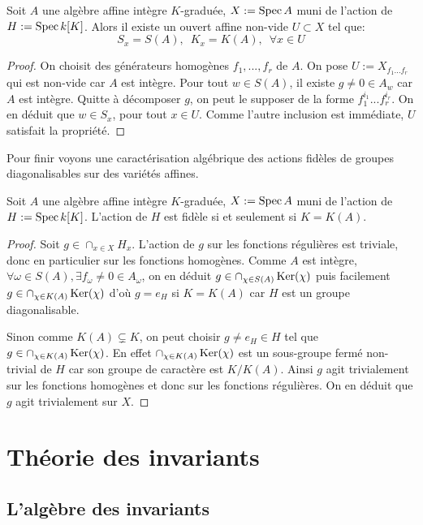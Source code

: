 \begin{prop}
Soit $A$ une algèbre affine intègre $K$-graduée, $X:=\operatorname{Spec} A$ muni de l'action de $H:=\operatorname{Spec} k[K]$. Alors il existe un ouvert affine non-vide $U\subset X$ tel que:
$$S_x=S(A),\,\,\, K_x=K(A),\,\,\, \forall x\in U$$
\end{prop}
\begin{proof}
On choisit des générateurs homogènes $f_1,...,f_r$ de $A$. On pose $U:=X_{f_1...f_r}$ qui est non-vide car $A$ est intègre. Pour tout $w \in S(A)$, il existe $g\neq0 \in A_w$ car $A$ est intègre. Quitte à décomposer $g$,  on peut le supposer de la forme $f_1^{i_1}...f_r^{i_r}$. On en déduit que $w \in S_x$, pour tout $x\in U$. Comme l'autre inclusion est immédiate, $U$ satisfait la propriété.
\end{proof}


Pour finir voyons une caractérisation algébrique des actions fidèles de groupes diagonalisables sur des variétés affines.

\begin{prop}
Soit $A$ une algèbre affine intègre $K$-graduée, $X:=\operatorname{Spec} A$ muni de l'action de $H:=\operatorname{Spec} k[K]$. L'action de $H$ est fidèle si et seulement si $K=K(A)$.
\end{prop}
\begin{proof}
Soit $g\in \cap_{x\in X}H_x$. L'action de $g$ sur les fonctions régulières est triviale, donc en particulier sur les fonctions homogènes. Comme $A$ est intègre, $\forall \omega \in S(A), \exists f_\omega\neq 0\in A_\omega$, on en déduit $g\in \cap_{\chi \in S(A)} \operatorname{Ker}(\chi)$ puis facilement $g\in \cap_{\chi \in K(A)} \operatorname{Ker}(\chi)$ d'où $g=e_H$ si $K=K(A)$ car $H$ est un groupe diagonalisable.

Sinon comme $K(A)\subsetneq K$, on peut choisir $g\neq e_H\in H$ tel que $g\in\cap_{\chi \in K(A)} \operatorname{Ker}(\chi)$. En effet $\cap_{\chi \in K(A)} \operatorname{Ker}(\chi)$ est un sous-groupe fermé non-trivial de $H$ car son groupe de caractère est $K/K(A)$. Ainsi $g$ agit trivialement sur les fonctions homogènes et donc sur les fonctions régulières. On en déduit que $g$ agit trivialement sur $X$.
\end{proof}

\section{Théorie des invariants}
\subsection{L'algèbre des invariants}

